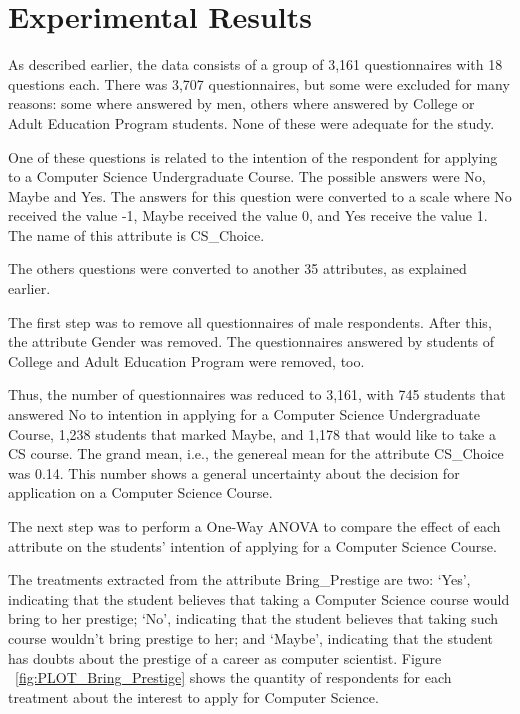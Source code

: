 \section{Experimental Results}\label{sec:results}%

As described earlier, the data consists of a group of 3,161 questionnaires with 18 questions each. There was 3,707 questionnaires, but some were excluded for many reasons: some where answered by men, others where answered by College or Adult Education Program students. None of these were adequate for the study. 

One of these questions is related to the intention of the respondent for applying to a Computer Science Undergraduate Course. The possible answers were No, Maybe and Yes. The answers for this question were converted to a scale where No received the value -1, Maybe received the value 0, and Yes receive the value 1. The name of this attribute is CS_Choice.

The others questions were converted to another 35 attributes, as explained earlier.

The first step was to remove all questionnaires of male respondents. After this, the attribute Gender was removed. The questionnaires answered by students of College and Adult Education Program were removed, too.

Thus, the number of questionnaires was reduced to 3,161, with 745 students that answered No to intention in applying for a Computer Science Undergraduate Course, 1,238 students that marked Maybe, and 1,178 that would like to take a CS course. The grand mean, i.e., the genereal mean for the attribute CS_Choice was 0.14. This number shows a general uncertainty about the decision for application on a Computer Science Course. 

The next step was to perform a One-Way ANOVA to compare the effect of each attribute on the students' intention of applying for a Computer Science Course.  

The treatments extracted from the attribute Bring_Prestige are two: `Yes', indicating that the student believes that taking a Computer Science course would bring to her prestige; `No', indicating that the student believes that taking such course wouldn't bring prestige to her; and `Maybe', indicating that the student has doubts about the prestige of a career as computer scientist. Figure ~\ref{fig:PLOT_Bring_Prestige} shows the quantity of respondents for each treatment about the interest to apply for Computer Science.

